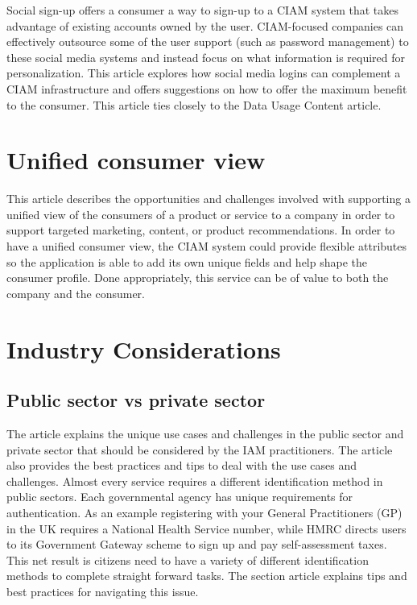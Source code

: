 Social sign-up offers a consumer a way to sign-up to a CIAM system that
takes advantage of existing accounts owned by the user. CIAM-focused
companies can effectively outsource some of the user support (such as
password management) to these social media systems and instead focus on
what information is required for personalization. This article explores
how social media logins can complement a CIAM infrastructure and offers
suggestions on how to offer the maximum benefit to the consumer. This
article ties closely to the Data Usage Content article.

\hypertarget{unified-consumer-view}{%
\section{Unified consumer view}\label{unified-consumer-view}}

This article describes the opportunities and challenges involved with
supporting a unified view of the consumers of a product or service to a
company in order to support targeted marketing, content, or product
recommendations. In order to have a unified consumer view, the CIAM
system could provide flexible attributes so the application is able to
add its own unique fields and help shape the consumer profile. Done
appropriately, this service can be of value to both the company and the
consumer.

\hypertarget{industry-considerations}{%
\section{Industry Considerations}\label{industry-considerations}}

\hypertarget{public-sector-vs-private-sector}{%
\subsection{Public sector vs private
sector}\label{public-sector-vs-private-sector}}

The article explains the unique use cases and challenges in the public
sector and private sector that should be considered by the IAM
practitioners. The article also provides the best practices and tips to
deal with the use cases and challenges. Almost every service requires a
different identification method in public sectors. Each governmental
agency has unique requirements for authentication. As an example
registering with your General Practitioners (GP) in the UK requires a
National Health Service number, while HMRC directs users to its
Government Gateway scheme to sign up and pay self-assessment taxes. This
net result is citizens need to have a variety of different
identification methods to complete straight forward tasks. The section
article explains tips and best practices for navigating this issue.

